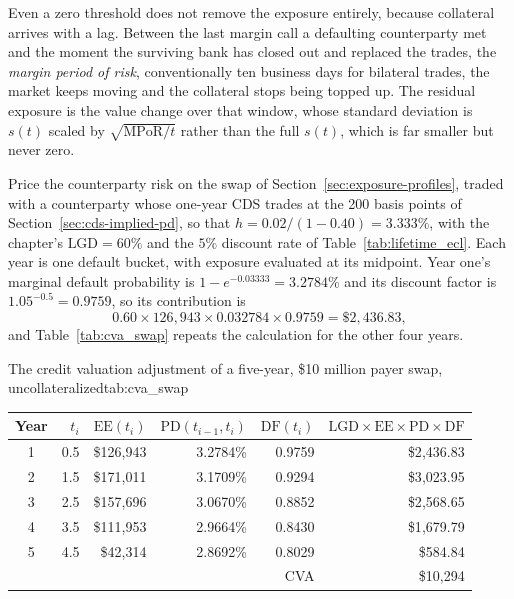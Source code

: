 \documentclass[../ai_in_finance]{subfiles}
\begin{document}
Even a zero threshold does not remove the exposure entirely, because collateral arrives with a lag. Between the last margin call a defaulting counterparty met and the moment the surviving bank has closed out and replaced the trades, the \emph{margin period of risk}, conventionally ten business days for bilateral trades, the market keeps moving and the collateral stops being topped up. The residual exposure is the value change over that window, whose standard deviation is $s(t)$ scaled by $\sqrt{\text{MPoR}/t}$ rather than the full $s(t)$, which is far smaller but never zero.


Price the counterparty risk on the swap of Section~\ref{sec:exposure-profiles}, traded with a counterparty whose one-year CDS trades at the 200 basis points of Section~\ref{sec:cds-implied-pd}, so that $h = 0.02/(1-0.40) = 3.333\%$, with the chapter's $\text{LGD} = 60\%$ and the $5\%$ discount rate of Table~\ref{tab:lifetime_ecl}. Each year is one default bucket, with exposure evaluated at its midpoint. Year one's marginal default probability is $1 - e^{-0.03333} = 3.2784\%$ and its discount factor is $1.05^{-0.5} = 0.9759$, so its contribution is
\begin{equation*}
0.60 \times 126{,}943 \times 0.032784 \times 0.9759 = \$2{,}436.83,
\end{equation*}
and Table~\ref{tab:cva_swap} repeats the calculation for the other four years.

\begin{booktable}[htbp]{The credit valuation adjustment of a five-year, \$10 million payer swap, uncollateralized}{tab:cva_swap}
\begin{tabular}{crrrrr}
\toprule
Year & $t_i$ & $\text{EE}(t_i)$ & $\text{PD}(t_{i-1},t_i)$ & $\text{DF}(t_i)$ & $\text{LGD}\times\text{EE}\times\text{PD}\times\text{DF}$ \\
\midrule
1 & 0.5 & \$126{,}943 & 3.2784\% & 0.9759 & \$2{,}436.83 \\
2 & 1.5 & \$171{,}011 & 3.1709\% & 0.9294 & \$3{,}023.95 \\
3 & 2.5 & \$157{,}696 & 3.0670\% & 0.8852 & \$2{,}568.65 \\
4 & 3.5 & \$111{,}953 & 2.9664\% & 0.8430 & \$1{,}679.79 \\
5 & 4.5 & \$42{,}314 & 2.8692\% & 0.8029 & \$584.84 \\
\midrule
\multicolumn{5}{r}{CVA} & \$10{,}294 \\
\bottomrule
\end{tabular}
\end{booktable}
\end{document}
